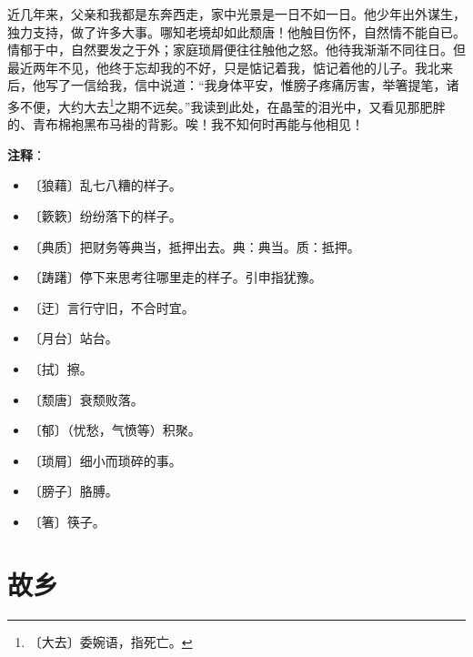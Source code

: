 \documentclass[12pt,UTF-8,openany]{ctexbook}
\begin{document}
\begin{large}
    近几年来，父亲和我都是东奔西走，家中光景是一日不如一日。他少年出外谋生，独力支持，做了许多大事。哪知老境却如此颓唐！他触目伤怀，自然情不能自已。情郁于中，自然要发之于外；家庭琐屑便往往触他之怒。他待我渐渐不同往日。但最近两年不见，他终于忘却我的不好，只是惦记着我，惦记着他的儿子。我北来后，他写了一信给我，信中说道：“我身体平安，惟膀子疼痛厉害，举箸提笔，诸多不便，大约大去\footnote{〔大去〕委婉语，指死亡。}之期不远矣。”我读到此处，在晶莹的泪光中，又看见那肥胖的、青布棉袍黑布马褂的背影。唉！我不知何时再能与他相见！
    
\end{large}


\newpage

\textbf{注释}：

\vspace{-1em}

\begin{itemize}
    \setlength\itemsep{-0.2em}
    \item 〔狼藉〕乱七八糟的样子。
    \item 〔簌簌〕纷纷落下的样子。
    \item 〔典质〕把财务等典当，抵押出去。典：典当。质：抵押。
    \item 〔踌躇〕停下来思考往哪里走的样子。引申指犹豫。
    \item 〔迂〕言行守旧，不合时宜。
    \item 〔月台〕站台。
    \item 〔拭〕擦。
    \item 〔颓唐〕衰颓败落。
    \item 〔郁〕（忧愁，气愤等）积聚。
    \item 〔琐屑〕细小而琐碎的事。
    \item 〔膀子〕胳膊。
    \item 〔箸〕筷子。
\end{itemize}

\chapter{故乡}
\end{document}
